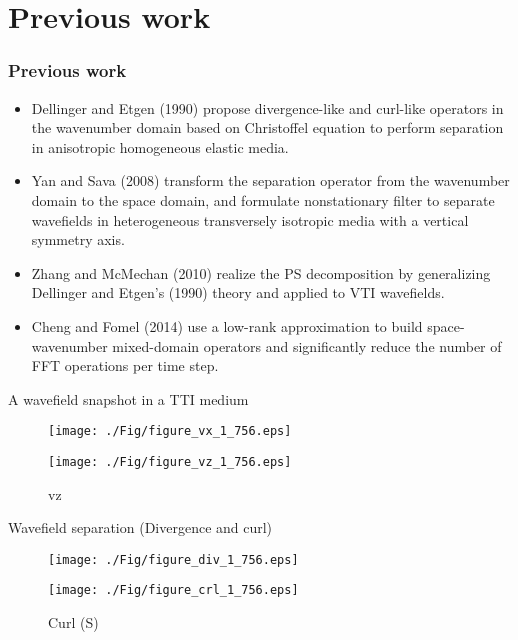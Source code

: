 \documentclass[aspectratio=43]{beamer}
\begin{document}
\section{Previous work}
\begin{frame}
  \frametitle{Previous work}
\begin{itemize}
\item{Dellinger and Etgen (1990) propose divergence-like and curl-like operators in the wavenumber domain based on Christoffel equation to perform separation in anisotropic homogeneous elastic media.}
\item{Yan and Sava (2008) transform the separation operator from the wavenumber domain to the space domain, and formulate nonstationary filter to separate wavefields in heterogeneous transversely isotropic media with a vertical symmetry axis.}
\item{Zhang and McMechan (2010) realize the PS decomposition by generalizing Dellinger and Etgen's (1990) theory and applied to VTI wavefields.}
\item{Cheng and Fomel (2014) use a low-rank approximation to build space-wavenumber mixed-domain operators and significantly reduce the number of FFT operations per time step.}
\end{itemize}
\end{frame}
\begin{frame}{A wavefield snapshot in a TTI medium}
   \begin{figure}[ht]
        \begin{minipage}[b]{0.45\linewidth}
            \centering
            \texttt{[image: ./Fig/figure\_vx\_1\_756.eps]}
            \caption{vx}
        \end{minipage}
        \hspace{0.5cm}
        \begin{minipage}[b]{0.45\linewidth}
            \centering
            \texttt{[image: ./Fig/figure\_vz\_1\_756.eps]}
            \caption{vz}
        \end{minipage}
    \end{figure}

\end{frame}
\begin{frame}{Wavefield separation (Divergence and curl)}
   \begin{figure}[ht]
        \begin{minipage}[b]{0.45\linewidth}
            \centering
            \texttt{[image: ./Fig/figure\_div\_1\_756.eps]}
            \caption{Divergence (P)}
        \end{minipage}
        \hspace{0.5cm}
        \begin{minipage}[b]{0.45\linewidth}
            \centering
            \texttt{[image: ./Fig/figure\_crl\_1\_756.eps]}
            \caption{Curl (S)}
        \end{minipage}
    \end{figure}
\end{frame}
\end{document}
